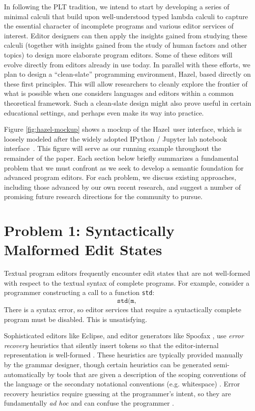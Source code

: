 \documentclass[letterpaper,USenglish]{lipics-v2016}
\newcommand{\Hazel}[0]{\textsf{Hazel}}
\begin{document}
In following the PLT tradition, we intend to start by developing a series of minimal calculi that build upon well-understood typed lambda calculi to capture the essential character of incomplete programs and various editor services of interest. Editor designers can then apply the insights gained from studying these calculi (together with insights gained from the study of human factors and other topics) to design more elaborate program editors. Some of these editors will evolve directly from editors already in use today. In parallel with these efforts, we plan to design a ``clean-slate'' programming environment, \Hazel, based directly on these first principles. This will allow researchers to cleanly explore the frontier of what is possible when one considers languages and editors within a common theoretical framework. Such a clean-slate design might also prove useful in certain educational settings, and perhaps even make its way into practice.

Figure \ref{fig:hazel-mockup} shows a mockup of the \Hazel ~user interface, which is loosely modeled after the widely adopted IPython / Jupyter lab notebook interface~\cite{PER-GRA:2007}. 
This figure will serve as our running example 
throughout the remainder of the paper. Each section below briefly summarizes a fundamental problem that we must confront as we seek to develop a semantic foundation for advanced program editors. For each problem, we discuss existing approaches, including those advanced by our own recent research, and suggest a number of promising future research directions for the community to pursue.

\section{Problem 1: Syntactically Malformed Edit States} 
Textual program editors frequently encounter edit states
that are not well-formed with respect to the textual syntax of complete
programs. For example, consider a programmer constructing a call to a function \lstinline{std}: 
\[
\texttt{std(m, }
\]
There is a syntax error, so editor services that require a syntactically
complete program must be disabled. This is unsatisfying. 

Sophisticated editors like Eclipse, and editor generators like Spoofax \cite{DBLP:conf/oopsla/KatsV10}, use \emph{error recovery} heuristics that silently insert tokens so that the editor-internal representation is well-formed \cite{DBLP:journals/siamcomp/AhoP72,charles1991practical,graham1979practical,DBLP:conf/oopsla/KatsJNV09}. These heuristics are typically provided manually by the grammar designer, though certain heuristics can be generated semi-automatically by tools that are given a description of the scoping conventions of the language or the secondary notational conventions (e.g. whitespace) \cite{DBLP:conf/oopsla/KatsJNV09,DBLP:conf/sle/JongeNKV09}. Error recovery heuristics require guessing at the programmer's intent, so they are fundamentally \emph{ad hoc} and can confuse the programmer \cite{DBLP:conf/oopsla/KatsJNV09}.
\end{document}
